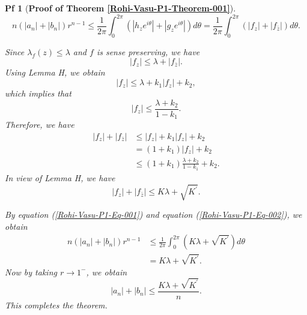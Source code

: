 \documentclass[10pt,a4paper]{amsart}
\newtheorem{pf}{Pf}
\begin{document}
\begin{pf} [{\bf Proof of Theorem   \ref{Rohi-Vasu-P1-Theorem-001}}]
\begin{equation}\label{Rohi-Vasu-P1-Eq-001}
n\left(\left|a_n\right|+\left|b_n\right|\right) r^{n-1}  \leq \frac{1}{2 \pi} \int_0^{2 \pi}\left(\left|h_z e^{i \theta}\right|+\left|g_z e^{i \theta}\right|\right) d \theta 
=\frac{1}{2 \pi} \int_0^{2 \pi}\left(\left|f_z\right|+\left|f_{\bar{z}}\right|\right) d \theta. 
\end{equation}

 Since $\lambda_f(z) \leq \lambda$ and $f$ is sense preserving, we have
$$
\left|f_z\right| \leq \lambda+\left|f_{\bar{z}}\right|.$$
Using Lemma H, we obtain
$$
\left|f_z\right| \leq \lambda+k_1\left|f_z\right|+k_2,
$$
which implies that
$$
\left|f_z\right| \leq \frac{\lambda
+k_2}{1-k_1}.
$$
Therefore, we have 
$$
\begin{aligned}
|f_z|+|f_{\bar{z}}| & \leq |f_z|+k_1|f_z|+k_2 \\
&=\left(1+k_1\right)\left|f_z\right|+k_2 \\
& \leq\left(1+k_1\right) \frac{\lambda+k_2}{1-k_1}+k_2.
\end{aligned}
$$
In view of Lemma H, we have 
\begin{equation}\label{Rohi-Vasu-P1-Eq-002}
|f_z|+|f_{\bar{z}}| \leq K \lambda+\sqrt{K^{\prime}}.
\end{equation}

By equation (\ref{Rohi-Vasu-P1-Eq-001}) and equation (\ref{Rohi-Vasu-P1-Eq-002}), we obtain
$$
\begin{aligned}
n\left(\left|a_n\right|+\left|b_n\right|\right) r^{n-1} & \leq \frac{1}{2 \pi} \int_0^{2 \pi}\left(K \lambda+\sqrt{K^{\prime}}\right) d \theta \\
&=K \lambda+\sqrt{K^{\prime}}.
\end{aligned}
$$
Now by taking $r \rightarrow 1^{-}$, we obtain
$$
\left|a_n\right|+\left|b_n\right| \leq \frac{K \lambda+\sqrt{K^{\prime}}}{n}.
$$
This completes the theorem.
\end{pf}
\end{document}
